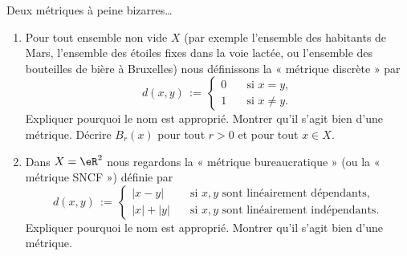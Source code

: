 
\begin{exercice}\label{exo0081}

Deux métriques à peine bizarres\ldots

\begin{enumerate}
\item
 Pour tout ensemble non vide $X$ (par exemple l'ensemble des habitants de Mars, l'ensemble des étoiles fixes dans la voie lactée, ou l'ensemble des bouteilles de bière à Bruxelles) nous définissons la « métrique discrète »  par
\begin{equation*}
d(x,y) \,:=\,
\left\{
\begin{array}{cl} 
0 \quad &\text{si } x=y,  \\[.2em]
1 \quad &\text{si } x \neq y. 
\end{array} 
\right.
\end{equation*}
Expliquer pourquoi le nom est approprié. Montrer qu'il s'agit bien d'une métrique.
Décrire $B_r(x)$ pour tout $r>0$ et pour tout $x \in X$.

\item 
Dans $X = \eR^2$ nous regardons la « métrique bureaucratique » (ou la « métrique SNCF »)
définie par
\begin{equation*}
d(x,y) \,:=\,
\left\{
\begin{array}{ll} 
|x-y| \quad 
  &\text{si } x, y \text{ sont linéairement dépendants},  \\[.2em]
|x|+|y| \quad 
  &\text{si } x, y \text{ sont linéairement indépendants}.
\end{array} \right.
\end{equation*}
Expliquer pourquoi le nom est approprié. Montrer qu'il s'agit bien d'une métrique.
\end{enumerate}


\end{exercice}
